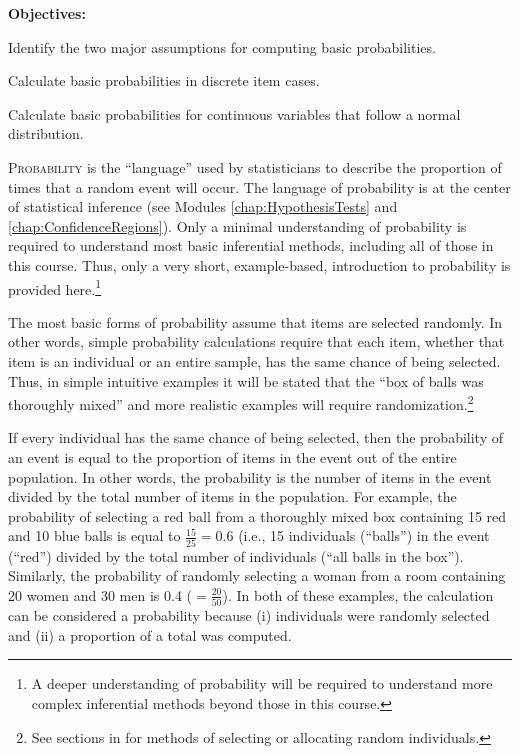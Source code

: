 \documentclass[10pt,openany]{book}\usepackage[]{graphicx}\usepackage[]{color}
\begin{document}
\begin{ChapObj}{\boxwidth}
  \textbf{Objectives:}
  \begin{Enumerate}
    \item Identify the two major assumptions for computing basic probabilities.
    \item Calculate basic probabilities in discrete item cases.
    \item Calculate basic probabilities for continuous variables that follow a normal distribution.
  \end{Enumerate}
\end{ChapObj}


\lettrine{P}{robability} is the ``language'' used by statisticians to describe the proportion of times that a random event will occur.  The language of probability is at the center of statistical inference (see Modules \ref{chap:HypothesisTests} and \ref{chap:ConfidenceRegions}). Only a minimal understanding of probability is required to understand most basic inferential methods, including all of those in this course.  Thus, only a very short, example-based, introduction to probability is provided here.\footnote{A deeper understanding of probability will be required to understand more complex inferential methods beyond those in this course.}

The most basic forms of probability assume that items are selected randomly.  In other words, simple probability calculations require that each item, whether that item is an individual or an entire sample, has the same chance of being selected.  Thus, in simple intuitive examples it will be stated that the ``box of balls was thoroughly mixed'' and more realistic examples will require randomization.\footnote{See sections in  for methods of selecting or allocating random individuals.}


If every individual has the same chance of being selected, then the probability of an event is equal to the proportion of items in the event out of the entire population.  In other words, the probability is the number of items in the event divided by the total number of items in the population.  For example, the probability of selecting a red ball from a thoroughly mixed box containing 15 red and 10 blue balls is equal to $\frac{15}{25}=0.6$ (i.e., 15 individuals (``balls'') in the event (``red'') divided by the total number of individuals (``all balls in the box'').  Similarly, the probability of randomly selecting a woman from a room containing 20 women and 30 men is 0.4 ($=\frac{20}{50}$).  In both of these examples, the calculation can be considered a probability because (i) individuals were randomly selected and (ii) a proportion of a total was computed.
\end{document}
